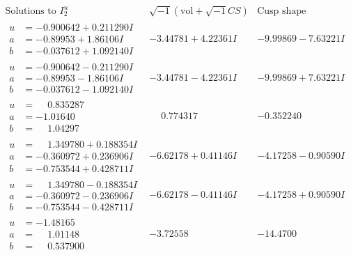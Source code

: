 \documentclass[1p]{elsarticle_modified}
\theoremstyle{definition}
\newcommand{\I}{\sqrt{-1}}
\begin{document}
$$\begin{array}{c|c|c}  
\text{Solutions to }I^u_{2}& \I (\text{vol} + \sqrt{-1}CS) & \text{Cusp shape}\\
 \hline 
\begin{aligned}
u &= -0.900642 + 0.211290 I \\
a &= -0.89953 + 1.86106 I \\
b &= -0.037612 + 1.092140 I\end{aligned}
 & -3.44781 + 4.22361 I & -9.99869 - 7.63221 I \\ \hline\begin{aligned}
u &= -0.900642 - 0.211290 I \\
a &= -0.89953 - 1.86106 I \\
b &= -0.037612 - 1.092140 I\end{aligned}
 & -3.44781 - 4.22361 I & -9.99869 + 7.63221 I \\ \hline\begin{aligned}
u &= \phantom{-}0.835287\phantom{ +0.000000I} \\
a &= -1.01640\phantom{ +0.000000I} \\
b &= \phantom{-}1.04297\phantom{ +0.000000I}\end{aligned}
 & \phantom{-}0.774317\phantom{ +0.000000I} & -0.352240\phantom{ +0.000000I} \\ \hline\begin{aligned}
u &= \phantom{-}1.349780 + 0.188354 I \\
a &= -0.360972 + 0.236906 I \\
b &= -0.753544 + 0.428711 I\end{aligned}
 & -6.62178 + 0.41146 I & -4.17258 - 0.90590 I \\ \hline\begin{aligned}
u &= \phantom{-}1.349780 - 0.188354 I \\
a &= -0.360972 - 0.236906 I \\
b &= -0.753544 - 0.428711 I\end{aligned}
 & -6.62178 - 0.41146 I & -4.17258 + 0.90590 I \\ \hline\begin{aligned}
u &= -1.48165\phantom{ +0.000000I} \\
a &= \phantom{-}1.01148\phantom{ +0.000000I} \\
b &= \phantom{-}0.537900\phantom{ +0.000000I}\end{aligned}
 & -3.72558\phantom{ +0.000000I} & -14.4700\phantom{ +0.000000I} \\ \hline\begin{aligned}

\end{aligned}
\end{array}$$
\end{document}

